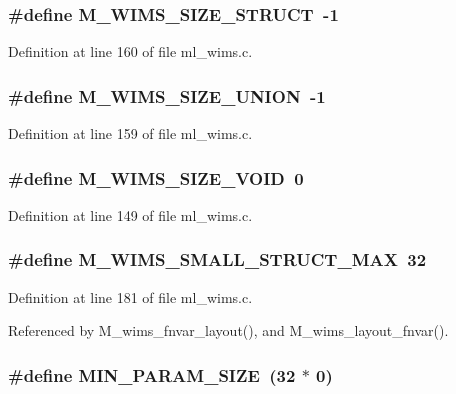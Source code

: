 \subsubsection{\setlength{\rightskip}{0pt plus 5cm}\#define M\_\-WIMS\_\-SIZE\_\-STRUCT~-1}\label{ml__wims_8c_0456cc76e243b3dc8e89906907409584}




Definition at line 160 of file ml\_\-wims.c.
\subsubsection{\setlength{\rightskip}{0pt plus 5cm}\#define M\_\-WIMS\_\-SIZE\_\-UNION~-1}\label{ml__wims_8c_3a41f85b04228a432a0e60f50985c2f3}




Definition at line 159 of file ml\_\-wims.c.
\subsubsection{\setlength{\rightskip}{0pt plus 5cm}\#define M\_\-WIMS\_\-SIZE\_\-VOID~0}\label{ml__wims_8c_dab221fb2d9e5375cc1bcee73209b2ea}




Definition at line 149 of file ml\_\-wims.c.
\subsubsection{\setlength{\rightskip}{0pt plus 5cm}\#define M\_\-WIMS\_\-SMALL\_\-STRUCT\_\-MAX~32}\label{ml__wims_8c_546af1320a24d1ac8c9673c9c261ca93}




Definition at line 181 of file ml\_\-wims.c.

Referenced by M\_\-wims\_\-fnvar\_\-layout(), and M\_\-wims\_\-layout\_\-fnvar().
\subsubsection{\setlength{\rightskip}{0pt plus 5cm}\#define MIN\_\-PARAM\_\-SIZE~(32 $\ast$ 0)}\label{ml__wims_8c_48f1f5d33d6770a468f7767465e07abb}




